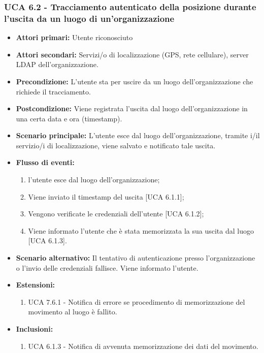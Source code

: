 \subsubsection{UCA 6.2 - Tracciamento autenticato della posizione durante l'uscita da un luogo di un'organizzazione}
\begin{itemize}
	\item \textbf{Attori primari:} Utente riconosciuto
	\item \textbf{Attori secondari:} Servizi/o di localizzazione (GPS, rete cellulare), server LDAP dell'organizzazione.
	\item \textbf{Precondizione:} L'utente sta per uscire da un luogo dell'organizzazione che richiede il tracciamento.
	\item \textbf{Postcondizione:} Viene registrata l'uscita dal luogo dell'organizzazione in una certa data e ora (timestamp).
	\item \textbf{Scenario principale:} L'utente esce dal luogo dell'organizzazione, tramite i/il servizio/i di localizzazione, viene salvato e notificato tale uscita. 
		\item \textbf{Flusso di eventi:}
	\begin{enumerate}
		\item l'utente esce dal luogo dell'organizzazione;
		\item Viene inviato il timestamp  del uscita [UCA 6.1.1];
		\item Vengono verificate le credenziali dell'utente [UCA 6.1.2];
		\item Viene informato l'utente che è stata memorizzata la sua uscita dal luogo [UCA 6.1.3].
	\end{enumerate}
	\item \textbf{Scenario alternativo:} Il tentativo di autenticazione presso l'organizzazione o l'invio delle credenziali fallisce. Viene informato l'utente.
	\item \textbf{Estensioni:}
		\begin{enumerate}
		\item UCA 7.6.1 - Notifica di errore se procedimento di memorizzazione del movimento al luogo è fallito.
	\end{enumerate}
	\item \textbf{Inclusioni:}
	\begin{enumerate}
		\item UCA 6.1.3 - Notifica di avvenuta memorizzazione dei dati del movimento.
	\end{enumerate}
\end{itemize}

